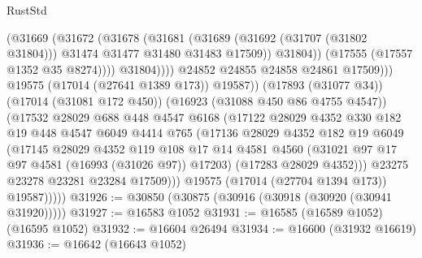 \begin{lexlean}{RustStd}
\begin{coremodule}
                                    (@31669
                                      (@31672
                                        (@31678
                                          (@31681
                                            (@31689
                                              (@31692 (@31707 (@31802 @31804)))
                                              @31474
                                              @31477
                                              @31480
                                              @31483
                                              @17509))
                                          @31804))
                                      (@17555 (@17557 @1352 @35 @8274))))
                                  @31804))))
                          @24852
                          @24855
                          @24858
                          @24861
                          @17509)))
                    @19575
                    (@17014 (@27641 @1389 @173))
                    @19587))
                (@17893 (@31077 @34))
                (@17014 (@31081 @172 @450))
                (@16923 (@31088 @450 @86 @4755 @4547))
                (@17532
                  @28029
                  @688
                  @448
                  @4547
                  @6168
                  (@17122
                    @28029
                    @4352
                    @330
                    @182
                    @19
                    @448
                    @4547
                    @6049
                    @4414
                    @765
                    (@17136
                      @28029
                      @4352
                      @182
                      @19
                      @6049
                      (@17145
                        @28029
                        @4352
                        @119
                        @108
                        @17
                        @14
                        @4581
                        @4560
                        (@31021 @97 @17 @97 @4581 (@16993 (@31026 @97)) @17203)
                        (@17283 @28029 @4352)))
                    @23275
                    @23278
                    @23281
                    @23284
                    @17509)))
              @19575
              (@17014 (@27704 @1394 @173))
              @19587)))))
@31926 := @30850 (@30875 (@30916 (@30918 (@30920 (@30941 @31920)))))
@31927 := @16583 @1052
@31931 := @16585 (@16589 @1052) (@16595 @1052)
@31932 := @16604 @26494
@31934 := @16600 (@31932 @16619)
@31936 := @16642 (@16643 @1052)

\end{coremodule}
\end{lexlean}

